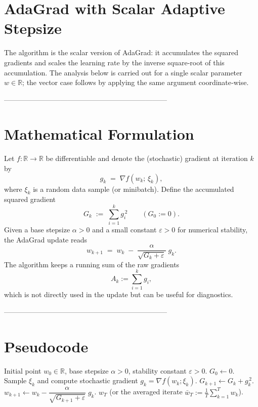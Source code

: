 \documentclass{article}
\newcommand{\R}{\mathbb{R}}
\begin{document}
\section*{AdaGrad with Scalar Adaptive Stepsize}

The algorithm is the scalar version of AdaGrad: it accumulates the squared gradients and scales the learning rate by the inverse square‑root of this accumulation.  The analysis below is carried out for a single scalar parameter $w\in\R$; the vector case follows by applying the same argument coordinate‑wise.

---------------------------------------------------------------------

\section*{Mathematical Formulation}

Let $f:\R\to\R$ be differentiable and denote the (stochastic) gradient at iteration $k$ by
\[
g_k \;=\; \nabla f(w_k;\,\xi_k),
\]
where $\xi_k$ is a random data sample (or minibatch).  
Define the accumulated squared gradient
\[
G_k \;:=\; \sum_{i=1}^{k} g_i^{\,2}\qquad (G_0:=0).
\]
Given a base stepsize $\alpha>0$ and a small constant $\varepsilon>0$ for numerical stability, the AdaGrad update reads
\begin{equation}
\boxed{
w_{k+1}\;=\;w_k \;-\; \frac{\alpha}{\sqrt{G_k+\varepsilon}}\; g_k.}
\tag{1}
\end{equation}
The algorithm keeps a running sum of the raw gradients
\[
A_k:=\sum_{i=1}^{k} g_i,
\]
which is not directly used in the update but can be useful for diagnostics.

---------------------------------------------------------------------

\section*{Pseudocode}

\begin{algorithm}[H]
\caption{Scalar AdaGrad}
\begin{algorithmic}[1]
\REQUIRE Initial point $w_0\in\R$, base stepsize $\alpha>0$, stability constant $\varepsilon>0$.
\STATE $G_0\gets 0$.
    \STATE Sample $\xi_k$ and compute stochastic gradient $g_k=\nabla f(w_k;\xi_k)$.
    \STATE $G_{k+1}\gets G_k+g_k^{\,2}$.
    \STATE $w_{k+1}\gets w_k-\dfrac{\alpha}{\sqrt{G_{k+1}+\varepsilon}}\;g_k$.
\ENDFOR
\RETURN $w_T$ (or the averaged iterate $\bar w_T:=\frac1T\sum_{k=1}^{T}w_k$).
\end{algorithmic}
\end{algorithm}
\end{document}
